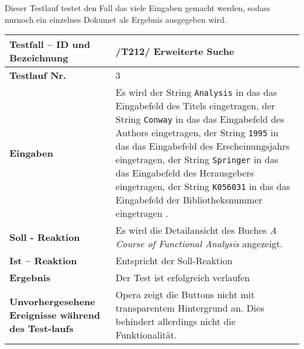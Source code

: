 Dieser Testlauf testet den Fall das viele Eingaben gemacht werden, sodass
nurnoch ein einzelnes Dokumet als Ergebnis ausgegeben wird.

\begin{longtable}{|p{5cm}|p{10cm}|}
\hline
\textbf{Testfall -- ID und Bezeichnung} & \textnormal{/T212/ Erweiterte
Suche} \\
\hline
\textbf{Testlauf Nr.} & \textnormal{3} \\
\hline
\textbf{Eingaben} & \textnormal{Es wird 
der String \lstinline{Analysis} in das das Eingabefeld des Titels eingetragen,
der String \lstinline{Conway} in das das Eingabefeld des Authors eingetragen,
der String \lstinline{1995} in das das Eingabefeld des Erscheinungsjahrs
eingetragen,
der String \lstinline{Springer} in das das Eingabefeld des Herausgebers
eingetragen,
der String \lstinline{K056031} in das das Eingabefeld der Bibliotheksnummer eingetragen
.} \\
\hline
\textbf{Soll - Reaktion} & \textnormal{Es wird die Detailansicht des Buches \textit{A
Course of Functional Analysis} angezeigt.} \\
\hline
\textbf{Ist -- Reaktion} & \textnormal{Entspricht der Soll-Reaktion} \\
\hline
\textbf{Ergebnis} & \textnormal{Der Test ist erfolgreich verlaufen} \\
\hline
\textbf{Unvorhergesehene Ereignisse w\"ahrend des Test-laufs } &
\textnormal{Opera zeigt die Buttons nicht mit transparentem Hintergrund an. Dies
behindert allerdings nicht die Funktionalität.} \\
\hline
\end{longtable}

